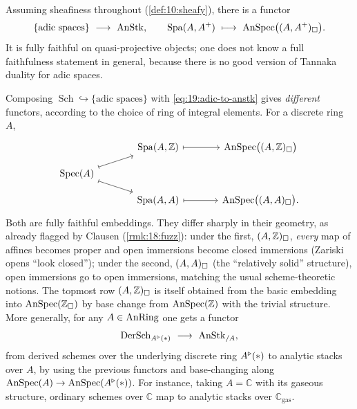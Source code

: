 \begin{example}
\label{ex:19:adic}
Assuming sheafiness throughout (\cref{def:10:sheafy}), there is a functor
\begin{equation}
\label{eq:19:adic-to-anstk}
\{\text{adic spaces}\}\ \longrightarrow\ \operatorname{AnStk},\qquad
\operatorname{Spa}(A,A^+)\ \longmapsto\ \operatorname{AnSpec}\bigl((A,A^+)_\square\bigr).
\end{equation}
It is fully faithful on quasi-projective objects; one does not know a
full faithfulness statement in general, because there is no good version of
Tannaka duality for adic spaces.
\end{example}

\begin{remark}
\label{rmk:19:two-embeddings}
Composing $\operatorname{Sch}\hookrightarrow\{\text{adic spaces}\}$ with
\eqref{eq:19:adic-to-anstk} gives \emph{different} functors, according to the
choice of ring of integral elements. For a discrete ring $A$,
\begin{equation*}
\begin{tikzcd}[row sep=small, column sep=large]
& \Spa(A,\mathbb Z)\arrow[r,mapsto] & \AnSpec\bigl((A,\mathbb Z)_\solid\bigr) \\
\operatorname{Spec}(A)\arrow[ur,mapsto]\arrow[dr,mapsto] & & \\
& \Spa(A,A)\arrow[r,mapsto] & \AnSpec\bigl((A,A)_\solid\bigr).
\end{tikzcd}
\end{equation*}
Both are fully faithful embeddings. They differ sharply in their geometry, as
already flagged by Clausen (\cref{rmk:18:fuzz}): under the first, $(A,\mathbb
Z)_\square$, \emph{every} map of affines becomes proper and open immersions become
closed immersions (Zariski opens ``look closed''); under the second,
$(A,A)_\square$ (the ``relatively solid'' structure), open immersions go to open
immersions, matching the usual scheme-theoretic notions. The topmost row
$(A,\mathbb Z)_\square$ is itself obtained from the basic embedding into
$\operatorname{AnSpec}(\mathbb Z_\square)$ by base change from $\operatorname{AnSpec}(\mathbb Z)$ with the
trivial structure. More generally, for any $A\in\operatorname{AnRing}$ one gets a functor
\begin{equation*}
\operatorname{DerSch}_{\ur A(\ast)}\ \longrightarrow\ \AnStk_{/A},
\end{equation*}
from derived schemes over the underlying discrete ring $A^{\triangleright}(\ast)$ to analytic
stacks over $A$, by using the previous functors and base-changing along
$\operatorname{AnSpec}(A)\to\operatorname{AnSpec}(A^{\triangleright}(\ast))$. For instance, taking $A=\mathbb C$ with its
gaseous structure, ordinary schemes over $\mathbb C$ map to analytic stacks over
$\mathbb C_{\mathrm{gas}}$.
\end{remark}

